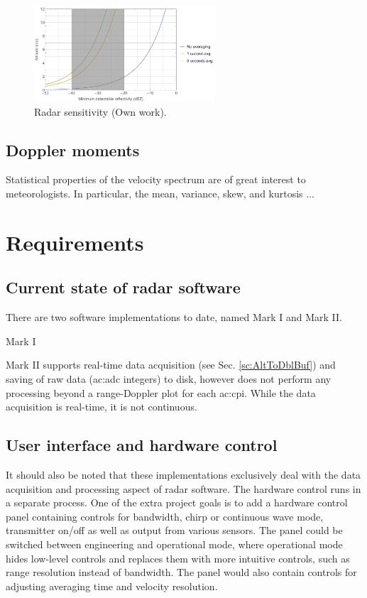 \documentclass{article}
\begin{document}
\begin{figure}
	\centering
	\includegraphics[width=0.6\textwidth]{sensitivity}
	\caption{Radar sensitivity (Own work).}
	\label{fig:Sensitivity}
\end{figure}

\subsection{Doppler moments}
Statistical properties of the velocity spectrum are of great interest to meteorologists. In particular, the mean, variance, skew, and kurtosis ...

\section{Requirements}
\subsection{Current state of radar software}
There are two software implementations to date, named Mark I and Mark II.

Mark I 


Mark II supports real-time data acquisition (see Sec. \ref{sc:AltToDblBuf}) and saving of raw data (\acrshort{ac:adc} integers) to disk, however does not perform any processing beyond a range-Doppler plot for each \acrshort{ac:cpi}. While the data acquisition is real-time, it is not continuous.

\subsection{User interface and hardware control}
It should also be noted that these implementations exclusively deal with the data acquisition and processing aspect of radar software. The hardware control runs in a separate process. One of the extra project goals is to add a hardware control panel containing controls for bandwidth, chirp or continuous wave mode, transmitter on/off as well as output from various sensors. The panel could be switched between engineering and operational mode, where operational mode hides low-level controls and replaces them with more intuitive controls, such as range resolution instead of bandwidth. The panel would also contain controls for adjusting averaging time and velocity resolution.
\end{document}
